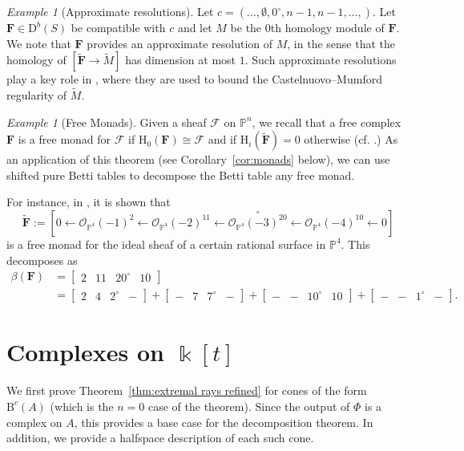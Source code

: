 \documentclass[12pt]{amsart}
\theoremstyle{definition}
\theoremstyle{remark}
\newtheorem{example}[lemma]{Example}
\newcommand{\kk}{\Bbbk}
\newcommand{\PP}{\mathbb{P}}
\newcommand{\HH}{\mathrm{H}}
\newcommand{\cc}{c}
\newcommand{\cO}{\mathcal{O}}
\newcommand{\cF}{\mathcal{F}}
\newcommand{\FF}{\mathbf{F}}
\newcommand{\defi}[1]{\textsf{#1}} %
\newcommand{\zp}{\circ}
\newcommand{\nothing}{\emptyset}
\newcommand{\DD}{\mathrm{D}}
\newcommand{\BBQ}{\mathrm{B}}
\begin{document}
\begin{example}[Approximate resolutions]
Let $\cc=(\dots,\nothing,0^\zp,n-1,n-1,\dots,)$.   Let $\FF\in \DD^b(S)$ be compatible with $\cc$ and let $M$ be the $0$th homology module of $\FF$.  We note that $\FF$ provides an approximate resolution of $M$, in the sense that the homology of $[\widetilde{\FF}\to \widetilde{M}]$ has dimension at most $1$.  Such approximate resolutions play a key role in \cite[Lemma~1.6]{gruson-lazarsfeld-peskine}, where they are used to bound the Castelnuovo--Mumford regularity of $\widetilde{M}$.
\end{example}

\begin{example}[Free Monads]\label{ex:monads}
Given a sheaf $\cF$ on $\PP^n$, we recall that a free complex $\FF$ is a \defi{free monad} for $\cF$ if $\HH_0(\FF)\cong \cF$ and if $\HH_i(\widetilde{\FF})=0$ otherwise (cf. \cite[\S8]{eis-floy-schrey}.)  As an application of this theorem (see Corollary~\ref{cor:monads} below), we can use shifted pure Betti tables to decompose the Betti table any free monad.  

For instance, in \cite[Example 8.2]{eis-floy-schrey}, it is shown that
\[
\widetilde{\FF}:=\left[0\gets \cO_{\PP^4}(-1)^2 \gets  \cO_{\PP^4}(-2)^{11}\gets \overset{\zp}{\cO_{\PP^4}(-3)^{20}}\gets \cO_{\PP^4}(-4)^{10}\gets 0 \right]
\]
is a free monad for the ideal sheaf of a certain rational surface in $\PP^4$.  This decomposes as
\begin{align*}
\beta(\FF)&=
\begin{bmatrix}
2&11&20^\zp&10
\end{bmatrix}
\\
&=
\begin{bmatrix}
2&4&2^\zp&-
\end{bmatrix}
+
\begin{bmatrix}
-&7&7^\zp&-
\end{bmatrix}
+
\begin{bmatrix}
-&-&10^\zp&10
\end{bmatrix}
+
\begin{bmatrix}
-&-&1^\zp&-
\end{bmatrix}.
\end{align*}
\end{example}







\section{Complexes on $\kk[t]$}\label{sec:A}
We first prove Theorem~\ref{thm:extremal rays refined} for cones of the form $\BBQ^{\cc}(A)$ (which is the $n=0$ case of the theorem).
Since the output of $\Phi$ is a complex on $A$, this provides a base case for the decomposition theorem.  In addition, we provide a halfspace description of each such cone.
\end{document}
